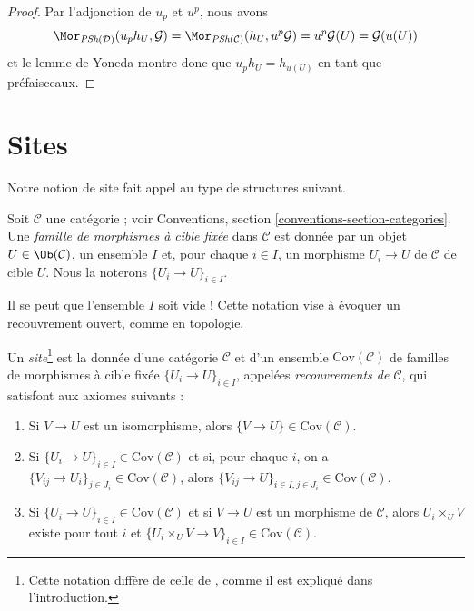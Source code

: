 \begin{proof}
Par l’adjonction de $u_p$ et $u^p$, nous avons
$$
\Mor_{\textit{PSh}(\mathcal{D})}(u_ph_U, \mathcal{G})
=
\Mor_{\textit{PSh}(\mathcal{C})}(h_U, u^p\mathcal{G})
=
u^p\mathcal{G}(U) =
\mathcal{G}(u(U))
$$
et le lemme de Yoneda montre donc que $u_ph_U = h_{u(U)}$ en tant que
préfaisceaux.
\end{proof}
   
    
 
 
 
  











\section{Sites}
\label{section-sites-definitions}

\noindent
Notre notion de site fait appel au type de structures suivant.

\begin{definition}
\label{definition-family-morphisms-fixed-target}
Soit $\mathcal{C}$ une catégorie ; voir Conventions,
section \ref{conventions-section-categories}.
Une {\it famille de morphismes à cible fixée} dans $\mathcal{C}$ est donnée
par un objet $U \in \Ob(\mathcal{C})$, un ensemble $I$ et, pour chaque
$i\in I$, un morphisme $U_i \to U$ de $\mathcal{C}$ de cible $U$.
Nous la noterons $\{U_i \to U\}_{i\in I}$.
\end{definition}

\noindent
Il se peut que l’ensemble $I$ soit vide ! Cette notation vise à évoquer
un recouvrement ouvert, comme en topologie.

\begin{definition}
\label{definition-site}
Un {\it site}\footnote{Cette notation diffère de celle de \cite{SGA4},
comme il est expliqué dans l’introduction.} est la donnée d’une catégorie
$\mathcal{C}$ et d’un ensemble $\text{Cov}(\mathcal{C})$ de familles de
morphismes à cible fixée $\{U_i \to U\}_{i \in I}$, appelées
{\it recouvrements de $\mathcal{C}$}, qui satisfont aux axiomes suivants :
\begin{enumerate}
\item Si $V \to U$ est un isomorphisme, alors $\{V \to U\} \in
\text{Cov}(\mathcal{C})$.
\item Si $\{U_i \to U\}_{i\in I} \in \text{Cov}(\mathcal{C})$ et si, pour
chaque $i$, on a $\{V_{ij} \to U_i\}_{j\in J_i} \in
\text{Cov}(\mathcal{C})$, alors
$\{V_{ij} \to U\}_{i \in I, j\in J_i} \in \text{Cov}(\mathcal{C})$.
\item Si $\{U_i \to U\}_{i\in I}\in \text{Cov}(\mathcal{C})$
et si $V \to U$ est un morphisme de $\mathcal{C}$, alors
$U_i \times_U V$ existe pour tout $i$ et
$\{U_i \times_U V \to V \}_{i\in I} \in \text{Cov}(\mathcal{C})$.
\end{enumerate}
\end{definition}

